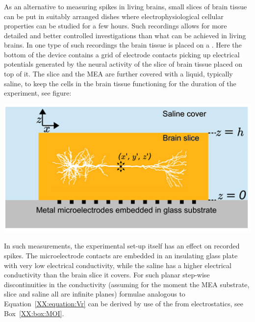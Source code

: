 \subsubsection{}
As an alternative to measuring spikes in living brains, small slices of brain tissue can be put in suitably arranged dishes
where electrophysiological cellular properties can be studied for a few hours. Such  recordings
allows for more detailed and better controlled investigations than what can be achieved in living brains. In one type of such recordings
the brain tissue is placed on a . Here the bottom of the device contains a grid of electrode
contacts picking up electrical potentials generated by the neural activity of the slice of  brain tissue placed on top of it. 
The slice and the MEA are further covered with a liquid, typically saline, to keep the cells in the brain tissue functioning for the duration
of the experiment,  see figure:
%
\begin{center}
\includegraphics{Figures/Spikes/Spikes-MEA-1-w43-r300}
\end{center}
\vspace*{6pt}
%
In such measurements, the experimental set-up itself has an effect on recorded spikes. The microelectrode contacts are 
embedded in an insulating glass plate with very low electrical conductivity, while the saline has
a higher electrical conductivity than the brain slice it covers. 
For such planar step-wise discontinuities in the conductivity (assuming for the moment the MEA substrate, slice and saline
all are infinite planes) formulae analogous to Equation~\ref{XX:equation:Vr} can be derived by use of the
 from electrostatics, see Box~\ref{XX:box:MOI}.

